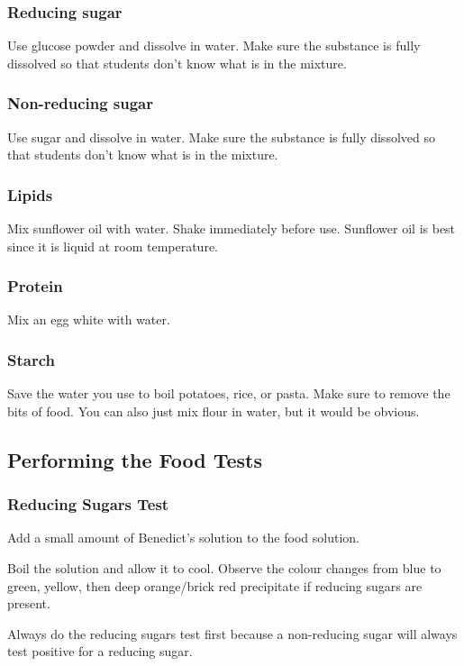 \subsubsection{Reducing sugar}
Use glucose powder and dissolve in water. Make sure the substance is fully dissolved so that students don't know what is in the mixture.

\subsubsection{Non-reducing sugar}
Use sugar and dissolve in water. Make sure the substance is fully dissolved so that students don't know what is in the mixture.

\subsubsection{Lipids}
Mix sunflower oil with water. Shake immediately before use. Sunflower oil is best since it is liquid at room temperature.

\subsubsection{Protein}
Mix an egg white with water.

\subsubsection{Starch}
Save the water you use to boil potatoes, rice, or pasta. Make sure to remove the bits of food. You can also just mix flour in water, but it would be obvious.


\subsection{Performing the Food Tests}

\subsubsection{Reducing Sugars Test}
\begin{itemize*}
\item Add a small amount of Benedict's solution to the food solution. 
\item Boil the solution and allow it to cool. Observe the colour changes from blue to green, yellow, then deep orange\slash brick red precipitate if reducing sugars are present.
\end{itemize*}
Always do the reducing sugars test first because a non-reducing sugar will always test positive for a reducing sugar.

